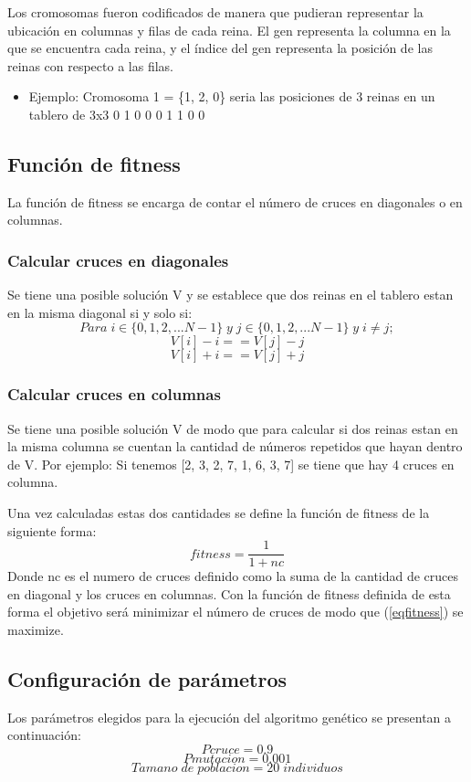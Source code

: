 \documentclass[11pt]{article}
\begin{document}
Los cromosomas fueron codificados de manera que pudieran representar la ubicaci\'on en columnas y filas de cada reina. El gen representa la columna en la que se encuentra cada reina, y el \'indice del gen representa la posici\'on de las reinas con respecto a las filas.
\begin{itemize}
\item Ejemplo: Cromosoma 1 = \{1, 2, 0\} seria las posiciones de 3 reinas en un tablero de 3x3
0 1 0
0 0 1
1 0 0
\end{itemize}
\subsection{Funci\'on de fitness}
La funci\'on de fitness se encarga de contar el n\'umero de
cruces en diagonales o en columnas.
\subsubsection{Calcular cruces en diagonales}
Se tiene una posible soluci\'on V y se establece que dos reinas en el tablero estan en la misma diagonal si y solo si:
\[Para\;i \in \{0, 1, 2, ... N-1\}\;y\;j \in \{0, 1, 2, ... N-1\}\;y\;i \neq j;\]
\[V[i] - i == V[j] - j\]
\[V[i] + i == V[j] + j\]
\subsubsection{Calcular cruces en columnas}
Se tiene una posible soluci\'on V de modo que para calcular si dos reinas estan en la
misma columna se cuentan la cantidad de n\'umeros repetidos que hayan dentro de V.
Por ejemplo: Si tenemos [2, 3, 2, 7, 1, 6, 3, 7] se tiene que hay 4 cruces en columna.

Una vez calculadas estas dos cantidades se define la funci\'on de fitness de la siguiente
forma:
\begin{equation}\label{eqfitness}
    fitness = \frac{1}{1+nc}
\end{equation}
Donde nc es el numero de cruces definido como la suma de la cantidad de cruces en diagonal
y los cruces en columnas.
Con la funci\'on de fitness definida de esta forma el objetivo ser\'a
minimizar el n\'umero de cruces de modo que (\ref{eqfitness}) se maximize.

\subsection{Configuraci\'on de par\'ametros}
Los par\'ametros elegidos para la ejecuci\'on del algoritmo gen\'etico se presentan a continuaci\'on:
\begin{equation}
Pcruce = 0.9
\end{equation}
\begin{equation}
Pmutacion = 0.001
\end{equation}
\begin{equation}
Tamano\;de\;poblacion = 20\;individuos
\end{equation}
\end{document}
